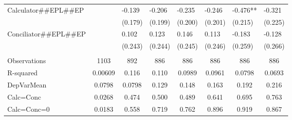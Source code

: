 \begin{tabular}{lrrrrrrr}
Calculator\#\#EPL\#\#EP & \multicolumn{1}{l}{} & \multicolumn{1}{l}{-0.139} & \multicolumn{1}{l}{-0.206} & \multicolumn{1}{l}{-0.235} & \multicolumn{1}{l}{-0.246} & \multicolumn{1}{l}{-0.476**} & \multicolumn{1}{l}{-0.321} \\
      & \multicolumn{1}{l}{} & \multicolumn{1}{l}{(0.179)} & \multicolumn{1}{l}{(0.199)} & \multicolumn{1}{l}{(0.200)} & \multicolumn{1}{l}{(0.201)} & \multicolumn{1}{l}{(0.215)} & \multicolumn{1}{l}{(0.225)} \\
Conciliator\#\#EPL\#\#EP & \multicolumn{1}{l}{} & \multicolumn{1}{l}{0.102} & \multicolumn{1}{l}{0.123} & \multicolumn{1}{l}{0.146} & \multicolumn{1}{l}{0.113} & \multicolumn{1}{l}{-0.183} & \multicolumn{1}{l}{-0.128} \\
      & \multicolumn{1}{l}{} & \multicolumn{1}{l}{(0.243)} & \multicolumn{1}{l}{(0.244)} & \multicolumn{1}{l}{(0.245)} & \multicolumn{1}{l}{(0.246)} & \multicolumn{1}{l}{(0.259)} & \multicolumn{1}{l}{(0.266)} \\
      & \multicolumn{1}{l}{} & \multicolumn{1}{l}{} & \multicolumn{1}{l}{} & \multicolumn{1}{l}{} & \multicolumn{1}{l}{} & \multicolumn{1}{l}{} & \multicolumn{1}{l}{} \\
      \midrule
Observations & \multicolumn{1}{c}{1103} & \multicolumn{1}{c}{892} & \multicolumn{1}{c}{886} & \multicolumn{1}{c}{886} & \multicolumn{1}{c}{886} & \multicolumn{1}{c}{886} & \multicolumn{1}{c}{886} \\
R-squared & \multicolumn{1}{c}{0.00609} & \multicolumn{1}{c}{0.116} & \multicolumn{1}{c}{0.110} & \multicolumn{1}{c}{0.0989} & \multicolumn{1}{c}{0.0961} & \multicolumn{1}{c}{0.0798} & \multicolumn{1}{c}{0.0693} \\
DepVarMean & \multicolumn{1}{c}{0.0798} & \multicolumn{1}{c}{0.0798} & \multicolumn{1}{c}{0.129} & \multicolumn{1}{c}{0.148} & \multicolumn{1}{c}{0.163} & \multicolumn{1}{c}{0.192} & \multicolumn{1}{c}{0.216} \\
Calc=Conc & \multicolumn{1}{c}{0.0268} & \multicolumn{1}{c}{0.474} & \multicolumn{1}{c}{0.500} & \multicolumn{1}{c}{0.489} & \multicolumn{1}{c}{0.641} & \multicolumn{1}{c}{0.695} & \multicolumn{1}{c}{0.763} \\
Calc=Conc=0 & \multicolumn{1}{c}{0.0183} & \multicolumn{1}{c}{0.558} & \multicolumn{1}{c}{0.719} & \multicolumn{1}{c}{0.762} & \multicolumn{1}{c}{0.896} & \multicolumn{1}{c}{0.919} & \multicolumn{1}{c}{0.867} \\
\bottomrule
\end{tabular}%
